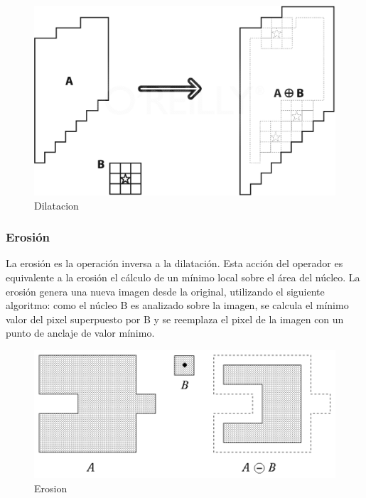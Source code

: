 \begin{figure}[hbtp]
\caption{Dilatacion}
\centering
\includegraphics[scale=0.3]{imagenes/erosion-model.png}
\end{figure}


\subsubsection{Erosión}
La erosión es la operación inversa a la dilatación. Esta acción del operador es equivalente a la erosión el cálculo de un mínimo local sobre el área del núcleo. La erosión genera una nueva imagen desde la original, utilizando el siguiente algoritmo: como el núcleo B es analizado sobre la imagen, se calcula el mínimo valor del pixel superpuesto por B y se reemplaza el pixel de la imagen con un punto de anclaje de valor mínimo. \cite{BookOpenCv}

\begin{figure}[hbtp]
\caption{Erosion}
\centering
\includegraphics[scale=1]{imagenes/erosion.png}
\end{figure}
